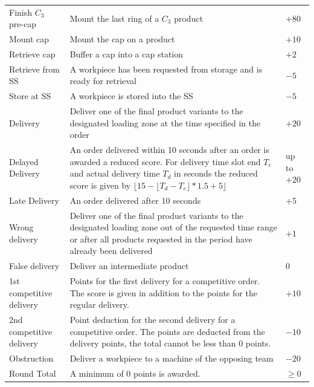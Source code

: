 \documentclass[12pt,twoside]{article}
\begin{document}
\begin{longtable}{p{}
    |p{}
    |p{}}
        \\
        Finish $C_3$ pre-cap & Mount the last ring of a $C_3$ product & $+80$
        \\
        Mount cap & Mount the cap on a product & $+10$
        \\
        Retrieve cap & Buffer a cap into a cap station & $+2$
        \\
        Retrieve from \ac{SS}
        & A workpiece has been requested from storage and is ready for retrieval
        & $-5$
        \\
        Store at \ac{SS}
        & A workpiece is stored into the \ac{SS}
        & $-5$
        \\
        Delivery
        & Deliver one of the final product variants to the designated loading
        zone at the time specified in the order
        & $+20$
        \\
        Delayed Delivery & An order delivered within 10 seconds after an order
        is awarded a reduced score. For delivery time slot end $T_e$ and actual
        delivery time $T_d$ in seconds the reduced score is given by \newline
        $\lfloor 15 - \lfloor T_d - T_e \rfloor * 1.5 + 5 \rfloor$
        & up to $+20$
        \\
        Late Delivery & An order delivered after 10 seconds & +5 \\
        Wrong delivery & Deliver one of the final product variants to
        the designated loading zone out of the requested time range or
        after all products requested in the period have already been
        delivered
        & $+1$
        \\
        False delivery & Deliver an intermediate product & $0$
        \\
        1st competitive delivery
        & Points for the first delivery for a competitive order. The score is
        given in addition to the points for the regular delivery.
        &$+ 10$
        \\
        2nd competitive delivery
        & Point deduction for the second delivery for a competitive order. The
        points are deducted from the delivery points, the total cannot be less
        than 0 points.
        &$- 10$
        \\
        Obstruction
        & Deliver a workpiece to a machine of the opposing team
        & $-20$
        \\
        \hline
      Round Total & A minimum of 0 points is awarded. & $\geq 0$ \\

\end{longtable}
\end{document}
